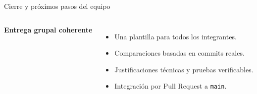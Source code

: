 \begin{frame}{Cierre y próximos pasos del equipo}
  \begin{columns}[T,onlytextwidth]
    {\Large\bfseries Entrega grupal coherente}\par\vspace{0.24cm}
    \begin{itemize}\setlength\itemsep{0.23cm}
      \item Una plantilla para todos los integrantes.
      \item Comparaciones basadas en commits reales.
      \item Justificaciones técnicas y pruebas verificables.
      \item Integración por Pull Request a \texttt{main}.
    \end{itemize}
  \end{columns}
\end{frame}
